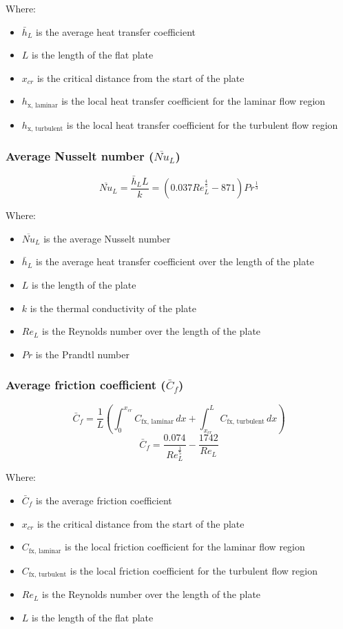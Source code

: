 \documentclass[11pt]{article}
\begin{document}
Where:
\begin{itemize}
\item \(\bar{h}_L\) is the average heat transfer coefficient
\item \(L\) is the length of the flat plate
\item \(x_{cr}\) is the critical distance from the start of the plate
\item \(h_{\text{x, laminar}}\) is the local heat transfer coefficient for the laminar flow region
\item \(h_{\text{x, turbulent}}\) is the local heat transfer coefficient for the turbulent flow region
\end{itemize}
\subsubsection{Average Nusselt number (\(\overline{Nu}_L\))}
\label{sec:orgc44b1be}
\[\overline{Nu}_L = \frac{\bar{h}_L L}{k} = (0.037 Re_L^ \frac{4}{5} - 871) Pr^{\frac{1}{3}}\]

Where:
\begin{itemize}
\item \(\overline{Nu}_L\) is the average Nusselt number
\item \(\bar{h}_L\) is the average heat transfer coefficient over the length of the plate
\item \(L\) is the length of the plate
\item \(k\) is the thermal conductivity of the plate
\item \(Re_L\) is the Reynolds number over the length of the plate
\item \(Pr\) is the Prandtl number
\end{itemize}
\subsubsection{Average friction coefficient (\(\bar{C}_f\))}
\label{sec:orgc1f7da1}
\[\bar{C}_f = \frac{1}{L} \left(\int_0^{x_{cr}} C_{\text{fx, laminar}} \, dx + \int_{x_{cr}}^L C_{\text{fx, turbulent}} \, dx \right)\]
\[\bar{C}_f = \frac{0.074}{Re_L^{\frac{1}{5}}} - \frac{1742}{Re_L}\]

Where:
\begin{itemize}
\item \(\bar{C}_f\) is the average friction coefficient
\item \(x_{cr}\) is the critical distance from the start of the plate
\item \(C_{\text{fx, laminar}}\) is the local friction coefficient for the laminar flow region
\item \(C_{\text{fx, turbulent}}\) is the local friction coefficient for the turbulent flow region
\item \(Re_L\) is the Reynolds number over the length of the plate
\item \(L\) is the length of the flat plate
\end{itemize}
\end{document}
